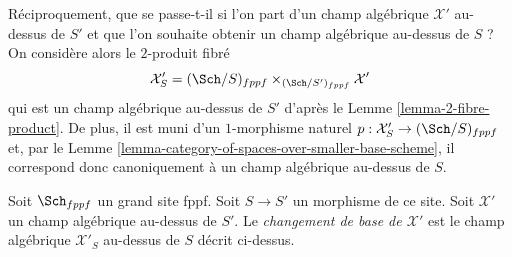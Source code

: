 \noindent
Réciproquement, que se passe-t-il si l'on part d'un champ algébrique $\mathcal{X}'$
au-dessus de $S'$ et que l'on souhaite obtenir un champ algébrique au-dessus de $S$ ?
On considère alors le $2$-produit fibré
$$
\mathcal{X}'_S
=
(\Sch/S)_{fppf} \times_{(\Sch/S')_{fppf}} \mathcal{X}'
$$
qui est un champ algébrique au-dessus de $S'$ d'après le
Lemme \ref{lemma-2-fibre-product}.
De plus, il est muni d'un $1$-morphisme naturel
$p : \mathcal{X}'_S \to (\Sch/S)_{fppf}$ et, par le
Lemme \ref{lemma-category-of-spaces-over-smaller-base-scheme},
il correspond donc canoniquement à un champ algébrique au-dessus de $S$.

\begin{definition}
\label{definition-change-of-base}
Soit $\Sch_{fppf}$ un grand site fppf.
Soit $S \to S'$ un morphisme de ce site.
Soit $\mathcal{X}'$ un champ algébrique au-dessus de $S'$.
Le {\it changement de base de $\mathcal{X}'$} est le
champ algébrique $\mathcal{X}'_S$ au-dessus de $S$ décrit ci-dessus.
\end{definition}










